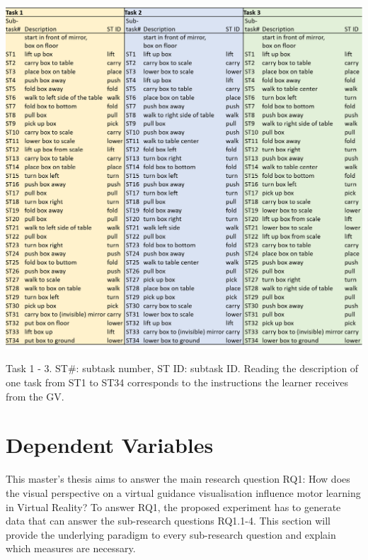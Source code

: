 \begin{table}[H]
	\centering
	\includegraphics[width=\textwidth]{figures/tasks.png}
	\caption[Task description]{Task 1 - 3. ST\#: subtask number, ST ID: subtask ID. Reading the description of one task from ST1 to ST34 corresponds to the instructions the learner receives from the GV.}
	\label{tab:tasks}
\end{table}

\section{Dependent Variables}
\label{sec:measures}
This master's thesis aims to answer the main research question RQ1: How does the visual perspective on a virtual guidance visualisation influence motor learning in Virtual Reality? To answer RQ1, the proposed experiment has to generate data that can answer the sub-research questions RQ1.1-4. This section will provide the underlying paradigm to every sub-research question and explain which measures are necessary.\\

